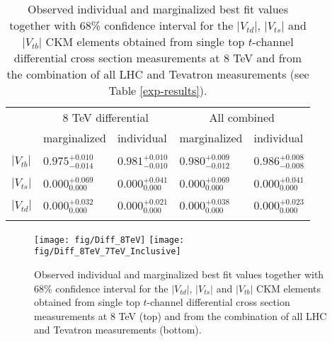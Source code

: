 \documentclass[11pt]{article}
\newcommand{\VTD}{|V_{td}|}
\newcommand{\VTS}{|V_{ts}|}
\newcommand{\VTB}{|V_{tb}|}
\begin{document}
\begin{table}[!ht]
\centering
\caption{Observed individual and marginalized best fit values together with 68\% confidence interval for the $\VTD$, $\VTS$ and $\VTB$ CKM elements obtained from  single top $t$-channel differential cross section measurements at 8 TeV and from the combination of all LHC and Tevatron measurements (see Table \ref{exp-results}).}
\label{FRVTX}
\begin{tabular}{l|ll|ll}
\hline
\multirow{2}{*}{} & \multicolumn{2}{c|}{8 TeV differential}                       & \multicolumn{2}{c}{All combined}                             \\ \cline{2-5}
                  & \multicolumn{1}{l|}{marginalized} & individual                & \multicolumn{1}{l|}{marginalized} & individual                \\ \hline \hline
                  &                                   &                           &                                   &                           \\
$|V_{tb}|$        & $0.975^{+0.010}_{-0.014}$         & $0.981^{+0.010}_{-0.010}$ & $0.980^{+0.009}_{-0.012}$         & $0.986^{+0.008}_{-0.008}$ \\
                  &                                   &                           &                                   &                           \\
$|V_{ts}|$        & $0.000^{+0.069}_{0.000}$         & $0.000^{+0.041}_{0.000}$ & $0.000^{+0.069}_{0.000}$         & $0.000^{+0.041}_{0.000}$ \\
                  &                                   &                           &                                   &                           \\
$|V_{td}|$        & $0.000^{+0.032}_{0.000}$         & $0.000^{+0.021}_{0.000}$ & $0.000^{+0.038}_{0.000}$         & $0.000^{+0.023}_{0.000}$ \\
                  &                                   &                           &                                   &                           \\ \hline
\end{tabular}
\end{table}


\begin{figure}[!ht]
  \begin{center}
        \texttt{[image: fig/Diff\_8TeV]}
      \texttt{[image: fig/Diff\_8TeV\_7TeV\_Inclusive]}
    \caption{Observed individual and marginalized best fit values together with 68\% confidence interval for the $\VTD$, $\VTS$ and $\VTB$ CKM elements obtained from single top $t$-channel differential cross section measurements at 8 TeV (top) and from the combination of all LHC and Tevatron measurements (bottom).
    \label{fig:marg}}
  \end{center}
\end{figure}
\end{document}
